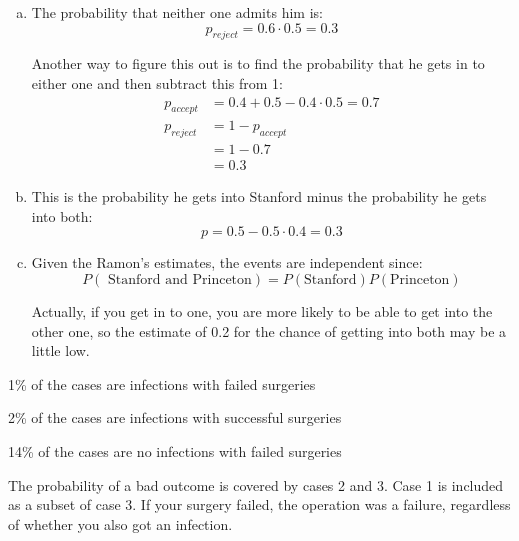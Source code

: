 \documentclass[letterpaper]{exam}
\begin{document}
\begin{description}
\begin{enumerate}[(a)]
      \end{enumerate}

    \item[31]
      \begin{enumerate}[(a)]
        \item The probability that neither one admits him is:
          \[
            p_{reject} = 0.6 \cdot 0.5 = \boxed{ 0.3 }
          \]

          Another way to figure this out is to find the probability that he
          gets in to either one and then subtract this from 1:
          \begin{align*}
            p_{accept} & = 0.4 + 0.5 - 0.4 \cdot 0.5 = 0.7 \\
            p_{reject} & = 1 - p_{accept} \\
                       & = 1 - 0.7 \\
                       & = 0.3
          \end{align*}

        \item
          This is the probability he gets into Stanford minus the probability
          he gets into both:
          \[
            p = 0.5 - 0.5 \cdot 0.4 = \boxed{ 0.3 }
          \]
          
        \item Given the Ramon's estimates, the events are independent since:
          \[
            P(\text{ Stanford and Princeton}) = P(\text{Stanford}) P(\text{Princeton})
          \]

          Actually, if you get in to one, you are more likely to be able to
          get into the other one, so the estimate of 0.2 for the chance of
          getting into both may be a little low.

      \end{enumerate}

    \item[32]
      \begin{enumerate*}
        \item 1\% of the cases are infections with failed surgeries
        \item 2\% of the cases are infections with successful surgeries
        \item 14\% of the cases are no infections with failed surgeries
      \end{enumerate*}

      The probability of a bad outcome is covered by cases 2 and 3. Case 1 is
      included as a subset of case 3. If your surgery failed, the operation
      was a failure, regardless of whether you also got an infection.


\end{description}
\end{document}
